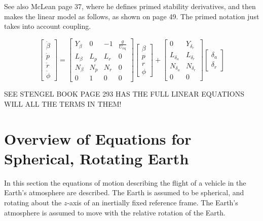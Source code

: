See also McLean page 37, where he defines primed stability derivatives, and then makes the linear model as follows, as shown on page 49.
The primed notation just takes into account coupling.

\begin{equation*}
  \left[
    \begin{array}{c}
      \dot{\beta} \\[4pt]
      \dot{p} \\[4pt]
      \dot{r} \\[4pt]
      \dot{\phi}
    \end{array}
  \right]=
  \left[
    \begin{array}{cccc}
      Y_{\beta} & 0 & -1 & \frac{g}{U_{\text{eq}}} \\[4pt]
      L_{\beta} & L_{p} & L_{r} & 0 \\[4pt]
      N_{\beta} & N_{p} & N_{r} & 0 \\[4pt]
      0 & 1 & 0 & 0
    \end{array}
  \right]
  \left[
    \begin{array}{c}
      \beta \\[4pt]
      p \\[4pt]
      r \\[4pt]
      \phi
    \end{array}
  \right]+
  \left[
    \begin{array}{cc}
      0 & Y_{\delta_{r}} \\[4pt]
      L_{\delta_{a}} & L_{\delta_{r}} \\[4pt]
      N_{\delta_{a}} & N_{\delta_{r}} \\[4pt]
      0 & 0
    \end{array}
  \right]
  \left[
    \begin{array}{c}
      \delta_{a} \\[4pt]
      \delta_{r}
    \end{array}
  \right]
\end{equation*}

SEE STENGEL BOOK PAGE 293 HAS THE FULL LINEAR EQUATIONS WILL ALL THE TERMS IN THEM!\@

\section{Overview of Equations for Spherical, Rotating Earth}

In this section the equations of motion describing the flight of a vehicle in the Earth's atmosphere are described.
The Earth is assumed to be spherical, and rotating about the $z$-axis of an inertially fixed reference frame.
The Earth's atmosphere is assumed to move with the relative rotation of the Earth.


